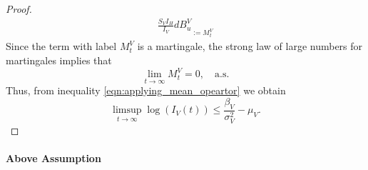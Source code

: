 \documentclass{amsart}
\theoremstyle{plain}
\theoremstyle{definition}
\begin{document}
\begin{proof}
\begin{equation}
\begin{aligned}
{                            \frac{S_V I_H}{I_V}
                            dB_u^V
                    }_{:=M_t^V}                  
                \end{aligned}
            \end{equation}
%
        Since the term with label $M_t^V$ is a martingale, 
        the strong law of large numbers for martingales \cite{Mao} implies that
        $$
            \lim_{t \to \infty} M_t^V = 0, \quad \text{a.s.}
        $$
        Thus, from inequality \eqref{eqn:applying_mean_opeartor} we obtain
        \begin{equation}\label{eqn:bound_vector_noise}
            \limsup_{t \to \infty} \log(I_V(t)) 
                \leq
                \frac{\beta_V}{\sigma_V^2} - \mu_V.           
        \end{equation}
        \end{proof}
%
%
%
%
    \paragraph{Above Assumption}
\end{document}
